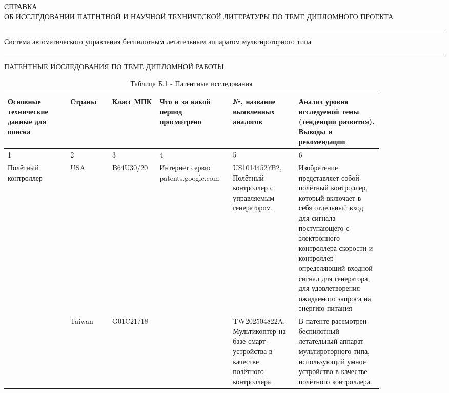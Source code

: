 \documentclass[a4paper]{bsuir-std}
\begin{document}
\thispagestyle{empty} %
\vspace*{\fill}
\begin{center}
  СПРАВКА\\

  ОБ ИССЛЕДОВАНИИ ПАТЕНТНОЙ И НАУЧНОЙ ТЕХНИЧЕСКОЙ ЛИТЕРАТУРЫ ПО ТЕМЕ ДИПЛОМНОГО ПРОЕКТА\\
  \rule{17cm}{1pt}
  Система автоматического управления беспилотным летательным аппаратом мультироторного типа
  \rule{17cm}{1pt}
\end{center}
\vspace{\fill}

\newpage
\thispagestyle{empty} %
\begin{landscape}
  
\captionsetup[table]{
    format=bsuirtable,
    singlelinecheck=false,
    labelsep=endash,
    skip=1mm,
    position=above,
    parindent=0pt, %
    labelformat=empty, %
  }

\begin{center}
    ПАТЕНТНЫЕ ИССЛЕДОВАНИЯ ПО ТЕМЕ ДИПЛОМНОЙ РАБОТЫ 
\end{center}
\begin{table}[H]
  \centering
  \caption{Таблица Б.1 - Патентные исследования}
  \small
  \begin{tabular}{|p{0.15\linewidth}|p{0.1\linewidth}|p{0.1\linewidth}|p{0.15\linewidth}|p{0.15\linewidth}|p{0.2\linewidth}|}
    \hline
    Основные технические данные для поиска & Страны & Класс МПК
    & Что и за какой период просмотрено                                                  
    & №, название выявленных аналогов
    & Анализ уровня исследуемой темы
      (тенденции развития). Выводы и рекомендации \\ \hline
    1 & 2 & 3 & 4 & 5& 6 \\ \hline
    Полётный контроллер & USA &  B64U30/20
    & Интернет сервис patents.google.com
    & US10144527B2, Полётный контроллер с управляемым генератором.
    & Изобретение представляет собой полётный контроллер,
      который включает в себя отдельный вход для
      сигнала поступающего с электронного контроллера скорости
      и контроллер определяющий входной сигнал для генератора,
      для удовлетворения ожидаемого запроса на энергию питания \\ \cline{2-3} \cline{5-6}
    & Taiwan &  G01C21/18 &
    & TW202504822A,
      Мультикоптер на базе смарт-устройства в качестве полётного
      контроллера.
    & В патенте рассмотрен беспилотный летательный аппарат
      мультироторного типа, использующий умное устройство в качестве
      полётного контроллера.\\ \hline
  \end{tabular}
\end{table}
\newpage
\thispagestyle{empty} %


\end{landscape}
\end{document}
